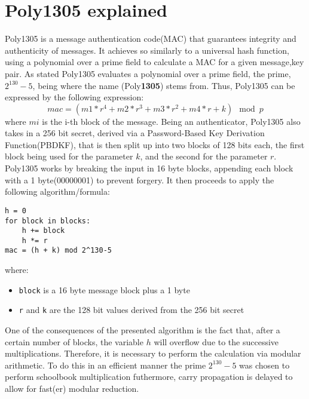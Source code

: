 \documentclass[twocolumn]{article}
\begin{document}
\section{Poly1305 explained}
Poly1305 is a message authentication code(MAC) that guarantees integrity and authenticity of messages. It achieves so similarly to a universal hash function, using a 
polynomial over a prime field to calculate a MAC for a given message,key pair. As stated Poly1305 evaluates a polynomial over a prime field, the prime, $2^{130}-5$, 
being where the name (Poly\textbf{1305}) stems from. Thus, Poly1305 can be expressed by the following expression: 
$$mac = (m1 * r^4 + m2 * r^3 + m3 * r^2 + m4 * r + k) \mod{p} $$ 
where $mi$ is the i-th block of the message. Being an authenticator, Poly1305 also takes in a 256 bit secret, derived via a Password-Based Key Derivation Function(PBDKF), 
that is then split up into two blocks of 128 bits each, the first block being used for the parameter $k$, and the second for the parameter $r$. Poly1305 works by breaking 
the input in 16 byte blocks, appending each block with a 1 byte(00000001) to prevent forgery. It then proceeds to apply the following algorithm/formula:

\begin{verbatim}
h = 0
for block in blocks:
    h += block
    h *= r
mac = (h + k) mod 2^130-5
\end{verbatim}

where:
\begin{itemize}
    \item \texttt{block} is a 16 byte message block plus a 1 byte
    \item \texttt{r} and \texttt{k} are the 128 bit values derived from the 256 bit secret
\end{itemize}

One of the consequences of the presented algorithm is the fact that, after a certain number of blocks, the variable $h$ will overflow due to the successive multiplications.
Therefore, it is necessary to perform the calculation via modular arithmetic. To do this in an efficient manner the prime $2^{130}-5$ was chosen to perform schoolbook 
multiplication futhermore, carry propagation is delayed to allow for fast(er) modular reduction.
\end{document}
